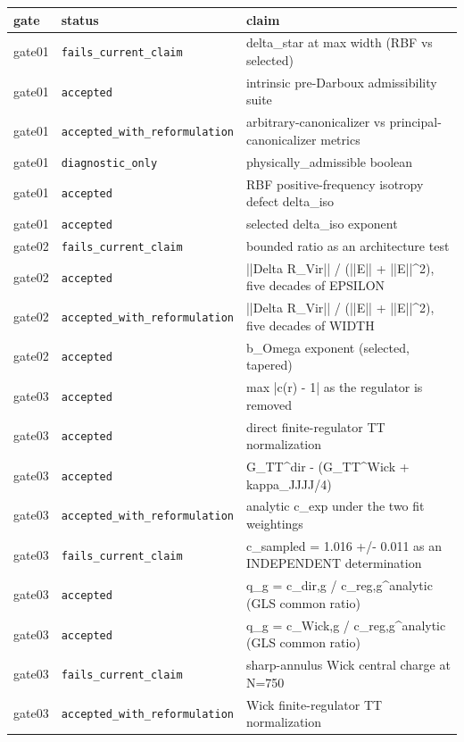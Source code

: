 \begin{tabular}{llp{}}
\hline
gate & status & claim \\
\hline
gate01 & \texttt{fails\_current\_claim} & delta\_star at max width (RBF vs selected) \\
gate01 & \texttt{accepted} & intrinsic pre-Darboux admissibility suite \\
gate01 & \texttt{accepted\_with\_reformulation} & arbitrary-canonicalizer vs principal-canonicalizer metrics \\
gate01 & \texttt{diagnostic\_only} & physically\_admissible boolean \\
gate01 & \texttt{accepted} & RBF positive-frequency isotropy defect delta\_iso \\
gate01 & \texttt{accepted} & selected delta\_iso exponent \\
gate02 & \texttt{fails\_current\_claim} & bounded ratio as an architecture test \\
gate02 & \texttt{accepted} & ||Delta R\_Vir|| / (||E|| + ||E||\textasciicircum{}2), five decades of EPSILON \\
gate02 & \texttt{accepted\_with\_reformulation} & ||Delta R\_Vir|| / (||E|| + ||E||\textasciicircum{}2), five decades of WIDTH \\
gate02 & \texttt{accepted} & b\_Omega exponent (selected, tapered) \\
gate03 & \texttt{accepted} & max |c(r) - 1| as the regulator is removed \\
gate03 & \texttt{accepted} & direct finite-regulator TT normalization \\
gate03 & \texttt{accepted} & G\_TT\textasciicircum{}dir - (G\_TT\textasciicircum{}Wick + kappa\_JJJJ/4) \\
gate03 & \texttt{accepted\_with\_reformulation} & analytic c\_exp under the two fit weightings \\
gate03 & \texttt{fails\_current\_claim} & c\_sampled = 1.016 +/- 0.011 as an INDEPENDENT determination \\
gate03 & \texttt{accepted} & q\_g = c\_dir,g / c\_reg,g\textasciicircum{}analytic (GLS common ratio) \\
gate03 & \texttt{accepted} & q\_g = c\_Wick,g / c\_reg,g\textasciicircum{}analytic (GLS common ratio) \\
gate03 & \texttt{fails\_current\_claim} & sharp-annulus Wick central charge at N=750 \\
gate03 & \texttt{accepted\_with\_reformulation} & Wick finite-regulator TT normalization \\

\end{tabular}
